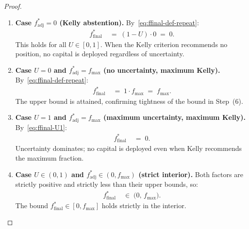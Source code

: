 \documentclass[12pt,openany]{book}
\numberwithin{equation}{chapter}
\theoremstyle{plain}
\theoremstyle{definition}
\theoremstyle{remark}
\numberwithin{equation}{chapter}
\theoremstyle{plain}
\begin{document}
\begin{proof}
\begin{enumerate}
\begin{enumerate}
          \item[\textup{(7c)}] \textbf{Case
                $f^*_{\mathrm{adj}} = 0$ (Kelly abstention).}
                By~\eqref{eq:ffinal-def-repeat}:
                \begin{align}
                  f^*_{\mathrm{final}}
                  &\;=\; (1 - U)\cdot 0
                  \;=\; 0.
                  \label{eq:ffinal-fadj0}
                \end{align}
                This holds for all $U \in [0,1]$.
                When the Kelly criterion recommends no
                position, no capital is deployed regardless
                of uncertainty.

          \item[\textup{(7d)}] \textbf{Case $U = 0$ and
                $f^*_{\mathrm{adj}} = f_{\max}$
                (no uncertainty, maximum Kelly).}
                By~\eqref{eq:ffinal-def-repeat}:
                \begin{align}
                  f^*_{\mathrm{final}}
                  &\;=\; 1 \cdot f_{\max}
                  \;=\; f_{\max}.
                  \label{eq:ffinal-max}
                \end{align}
                The upper bound is attained, confirming
                tightness of the bound in Step~(6).

          \item[\textup{(7e)}] \textbf{Case $U = 1$ and
                $f^*_{\mathrm{adj}} = f_{\max}$
                (maximum uncertainty, maximum Kelly).}
                By~\eqref{eq:ffinal-U1}:
                \begin{align}
                  f^*_{\mathrm{final}}
                  &\;=\; 0.
                  \label{eq:ffinal-both-max}
                \end{align}
                Uncertainty dominates; no capital is
                deployed even when Kelly recommends the
                maximum fraction.

          \item[\textup{(7f)}] \textbf{Case $U \in (0,1)$
                and $f^*_{\mathrm{adj}} \in (0, f_{\max})$
                (strict interior).}
                Both factors are strictly positive and
                strictly less than their upper bounds, so:
                \begin{align}
                  f^*_{\mathrm{final}}
                  &\;\in\; \bigl(0,\, f_{\max}\bigr).
                  \label{eq:ffinal-interior}
                \end{align}
                The bound $f^*_{\mathrm{final}} \in
                [0, f_{\max}]$ holds strictly in the
                interior.
        \end{enumerate}


\end{enumerate}
\end{proof}
\end{document}
